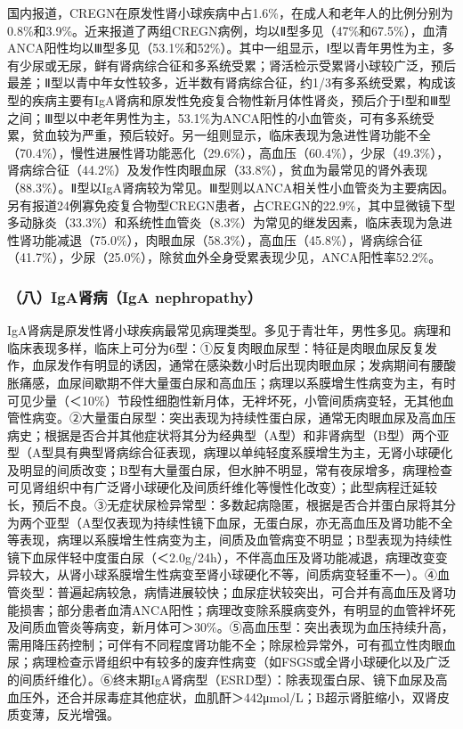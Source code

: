 国内报道，CREGN在原发性肾小球疾病中占1.6\%，在成人和老年人的比例分别为0.8\%和3.9\%。近来报道了两组CREGN病例，均以Ⅱ型多见（47\%和67.5\%），血清ANCA阳性均以Ⅲ型多见（53.1\%和52\%）。其中一组显示，Ⅰ型以青年男性为主，多有少尿或无尿，鲜有肾病综合征和多系统受累；肾活检示受累肾小球较广泛，预后最差；Ⅱ型以青中年女性较多，近半数有肾病综合征，约1/3有多系统受累，构成该型的疾病主要有IgA肾病和原发性免疫复合物性新月体性肾炎，预后介于Ⅰ型和Ⅲ型之间；Ⅲ型以中老年男性为主，53.1\%为ANCA阳性的小血管炎，可有多系统受累，贫血较为严重，预后较好。另一组则显示，临床表现为急进性肾功能不全（70.4\%），慢性进展性肾功能恶化（29.6\%），高血压（60.4\%），少尿（49.3\%），肾病综合征（44.2\%）及发作性肉眼血尿（33.8\%），贫血为最常见的肾外表现（88.3\%）。Ⅱ型以IgA肾病较为常见。Ⅲ型则以ANCA相关性小血管炎为主要病因。另有报道24例寡免疫复合物型CREGN患者，占CREGN的22.9\%，其中显微镜下型多动脉炎（33.3\%）和系统性血管炎（8.3\%）为常见的继发因素，临床表现为急进性肾功能减退（75.0\%），肉眼血尿（58.3\%），高血压（45.8\%），肾病综合征（41.7\%），少尿（25.0\%），除贫血外全身受累表现少见，ANCA阳性率52.2\%。

\subsubsection{（八）IgA肾病（IgA nephropathy）}

IgA肾病是原发性肾小球疾病最常见病理类型。多见于青壮年，男性多见。病理和临床表现多样，临床上可分为6型：①反复肉眼血尿型：特征是肉眼血尿反复发作，血尿发作有明显的诱因，通常在感染数小时后出现肉眼血尿；发病期间有腰酸胀痛感，血尿间歇期不伴大量蛋白尿和高血压；病理以系膜增生性病变为主，有时可见少量（＜10\%）节段性细胞性新月体，无袢坏死，小管间质病变轻，无其他血管性病变。②大量蛋白尿型：突出表现为持续性蛋白尿，通常无肉眼血尿及高血压病史；根据是否合并其他症状将其分为经典型（A型）和非肾病型（B型）两个亚型（A型具有典型肾病综合征表现，病理以单纯轻度系膜增生为主，无肾小球硬化及明显的间质改变；B型有大量蛋白尿，但水肿不明显，常有夜尿增多，病理检查可见肾组织中有广泛肾小球硬化及间质纤维化等慢性化改变）；此型病程迁延较长，预后不良。③无症状尿检异常型：多数起病隐匿，根据是否合并蛋白尿将其分为两个亚型（A型仅表现为持续性镜下血尿，无蛋白尿，亦无高血压及肾功能不全等表现，病理以系膜增生性病变为主，间质及血管病变不明显；B型表现为持续性镜下血尿伴轻中度蛋白尿（＜2.0g/24h），不伴高血压及肾功能减退，病理改变变异较大，从肾小球系膜增生性病变至肾小球硬化不等，间质病变轻重不一）。④血管炎型：普遍起病较急，病情进展较快；血尿症状较突出，可合并有高血压及肾功能损害；部分患者血清ANCA阳性；病理改变除系膜病变外，有明显的血管袢坏死及间质血管炎等病变，新月体可＞30\%。⑤高血压型：突出表现为血压持续升高，需用降压药控制；可伴有不同程度肾功能不全；除尿检异常外，可有孤立性肉眼血尿；病理检查示肾组织中有较多的废弃性病变（如FSGS或全肾小球硬化以及广泛的间质纤维化）。⑥终末期IgA肾病型（ESRD型）：除表现蛋白尿、镜下血尿及高血压外，还合并尿毒症其他症状，血肌酐＞442μmol/L；B超示肾脏缩小，双肾皮质变薄，反光增强。


